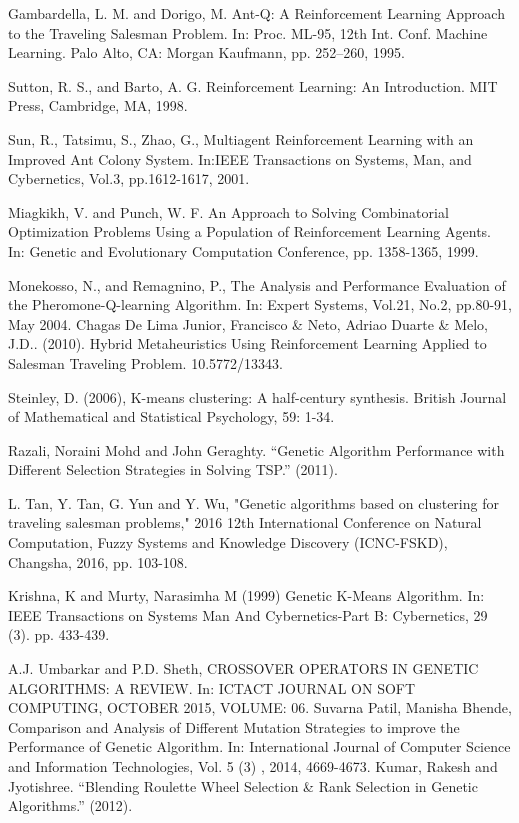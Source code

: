 \documentclass[10pt]{article}
\begin{document}
\begin{thebibliography}{9}
Gambardella, L. M. and Dorigo, M. Ant-Q: A Reinforcement Learning Approach to the Traveling Salesman Problem. In: Proc. ML-95, 12th Int. Conf. Machine Learning. Palo Alto, CA: Morgan Kaufmann, pp. 252–260, 1995.

Sutton,  R.  S.,  and  Barto,  A.  G. Reinforcement  Learning:  An  Introduction.  MIT  Press, Cambridge, MA, 1998.

Sun,  R.,  Tatsimu,  S.,  Zhao,  G.,  Multiagent  Reinforcement  Learning  with  an  Improved Ant  Colony  System.  In:IEEE  Transactions  on  Systems,  Man,  and  Cybernetics,  Vol.3, pp.1612-1617, 2001.

 Miagkikh,  V.  and  Punch,  W.  F.  An  Approach  to  Solving  Combinatorial  Optimization Problems   Using   a   Population   of   Reinforcement   Learning   Agents.   In: Genetic   and Evolutionary Computation Conference, pp. 1358-1365, 1999. 

 Monekosso,  N.,  and  Remagnino,  P.,  The  Analysis  and  Performance  Evaluation  of  the Pheromone-Q-learning Algorithm. In: Expert Systems, Vol.21, No.2, pp.80-91, May 2004. 
Chagas De Lima Junior, Francisco \& Neto, Adriao Duarte \& Melo, J.D.. (2010). Hybrid Metaheuristics Using Reinforcement Learning Applied to Salesman Traveling Problem. 10.5772/13343.

Steinley, D. (2006), K-means clustering: A half-century synthesis. British Journal of Mathematical and Statistical Psychology, 59: 1-34.

Razali, Noraini Mohd and John Geraghty. “Genetic Algorithm Performance with Different Selection Strategies in Solving TSP.” (2011).

L. Tan, Y. Tan, G. Yun and Y. Wu, "Genetic algorithms based on clustering for traveling salesman problems," 2016 12th International Conference on Natural Computation, Fuzzy Systems and Knowledge Discovery (ICNC-FSKD), Changsha, 2016, pp. 103-108.

Krishna, K and Murty, Narasimha M (1999) Genetic K-Means Algorithm. In: IEEE Transactions on Systems Man And Cybernetics-Part B: Cybernetics, 29 (3). pp. 433-439.

A.J. Umbarkar and P.D. Sheth, CROSSOVER OPERATORS IN GENETIC ALGORITHMS: A REVIEW. In: ICTACT JOURNAL ON SOFT COMPUTING, OCTOBER 2015, VOLUME: 06.
Suvarna Patil, Manisha Bhende, Comparison and Analysis of Different Mutation Strategies to improve the Performance of Genetic Algorithm. In:  International Journal of Computer Science and Information Technologies, Vol. 5 (3) , 2014, 4669-4673.
Kumar, Rakesh and Jyotishree. “Blending Roulette Wheel Selection \& Rank Selection in Genetic Algorithms.” (2012).
\end{thebibliography}
\end{document}
